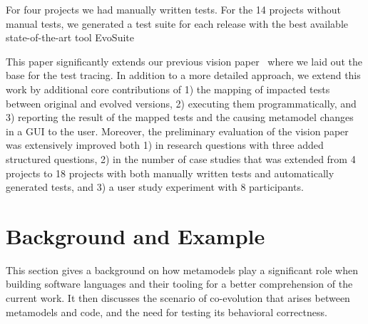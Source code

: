 %
For four projects we had manually written tests. 
For the 14 projects without manual tests, we generated a test suite for each release with the best available state-of-the-art tool EvoSuite \cite{fraser2011evosuite}

This paper significantly extends our previous vision paper~\cite{Kebaili2023towards} where we laid out the base for the test tracing. In addition to a more detailed approach, we extend this work by additional core contributions of 1) the mapping of impacted tests between original and evolved versions, 2) executing them programmatically, and 3) reporting the result of the mapped tests and the causing metamodel changes in a GUI to the user. 
Moreover, the preliminary evaluation of the vision paper~\cite{Kebaili2023towards} was extensively improved both 1) in research questions with three added structured questions, 2) in the number of case studies that was extended from 4 projects to 18 projects with both manually written tests and automatically generated tests, and 3) a user study experiment with 8 participants. 

 


\section{Background and Example}
\label{sec_background}




This section gives a background on how metamodels play a significant role when building software languages and their tooling for a better comprehension of the current work. It then discusses the scenario of co-evolution that arises between metamodels and code, and the need for testing its behavioral correctness. 

